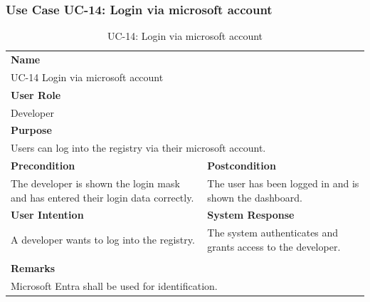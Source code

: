 \subsubsection{Use Case UC-14: Login via microsoft account}\label{subsubsec:use-case-uc-14:-login-via-microsoft-account}

\begin{table}[H]
    \centering
    \begin{tabular}{|p{}|p{}|}

        \hline
        \multicolumn{2}{|l|}{\rowcolor{gray!50}\textbf{Name}} \\
        \multicolumn{2}{|l|}{UC-14 Login via microsoft account} \\ \hline

        \multicolumn{2}{|l|}{\rowcolor{gray!50}\textbf{User Role}} \\
        \multicolumn{2}{|l|}{Developer} \\ \hline

        \multicolumn{2}{|l|}{\rowcolor{gray!50}\textbf{Purpose}} \\
        \multicolumn{2}{|l|}{Users can log into the registry via their microsoft account.} \\ \hline

        \rowcolor{gray!50}\textbf{Precondition} & \rowcolor{gray!50}\textbf{Postcondition} \\
        The developer is shown the login mask and has entered their login data correctly.
        &
        The user has been logged in and is shown the dashboard.  \\ \hline

        \rowcolor{gray!50}\textbf{User Intention} & \rowcolor{gray!50}\textbf{System Response} \\
        A developer wants to log into the registry.
        &
        The system authenticates and grants access to the developer. \\ \hline

        & \\ \hline

        \multicolumn{2}{|l|}{\rowcolor{gray!50}\textbf{Remarks}} \\
        \multicolumn{2}{|p{1\textwidth}|}{Microsoft Entra shall be used for identification.} \\ \hline
    \end{tabular}
    \caption{UC-14: Login via microsoft account}
    \label{tab:uc-login-via-microsoft-account}
\end{table}

